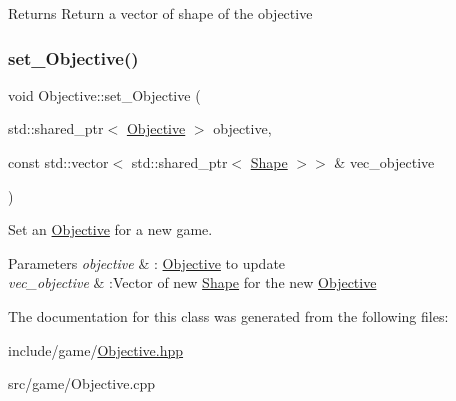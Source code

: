 \begin{DoxyReturn}{Returns}
Return a vector of shape of the objective 
\end{DoxyReturn}
\mbox{\label{classObjective_adecebbf5e11f3e778b1b7f48735a0765}} 
\subsubsection{\texorpdfstring{set\+\_\+\+Objective()}{set\_Objective()}}
{\footnotesize\ttfamily void Objective\+::set\+\_\+\+Objective (\begin{DoxyParamCaption}\item[{std\+::shared\+\_\+ptr$<$ \hyperlink{classObjective}{Objective} $>$}]{objective,  }\item[{const std\+::vector$<$ std\+::shared\+\_\+ptr$<$ \hyperlink{classShape}{Shape} $>$$>$ \&}]{vec\+\_\+objective }\end{DoxyParamCaption})\hspace{0.3cm}{\ttfamily [static]}}



Set an \hyperlink{classObjective}{Objective} for a new game. 


\begin{DoxyParams}{Parameters}
{\em objective} & \+: \hyperlink{classObjective}{Objective} to update \\
\hline
{\em vec\+\_\+objective} & \+:Vector of new \hyperlink{classShape}{Shape} for the new \hyperlink{classObjective}{Objective} \\
\hline
\end{DoxyParams}


The documentation for this class was generated from the following files\+:\begin{DoxyCompactItemize}
\item 
include/game/\hyperlink{Objective_8hpp}{Objective.\+hpp}\item 
src/game/Objective.\+cpp\end{DoxyCompactItemize}
